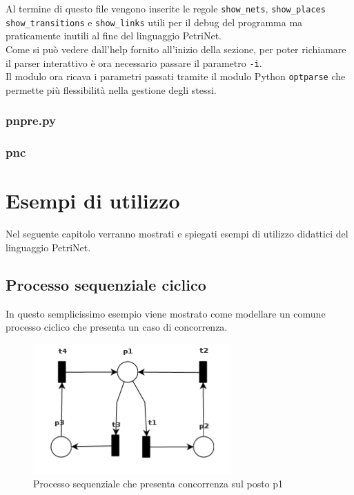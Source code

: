 \documentclass[italian,12pt]{book}
\begin{document}
Al termine di questo file vengono inserite le regole {\tt show\_nets}, {\tt show\_places} {\tt show\_transitions} e {\tt show\_links} utili per il debug del programma ma praticamente inutili al fine del linguaggio PetriNet.\\
Come si può vedere dall'help fornito all'inizio della sezione, per poter
richiamare il parser interattivo è ora necessario passare il parametro {\tt -i}.\\
Il modulo ora ricava i parametri passati tramite il modulo Python {\tt optparse} che 
permette più flessibilità nella gestione degli stessi.

\subsection{pnpre.py}

\subsection{pnc}


\chapter{Esempi di utilizzo}\label{cap:esempi}
Nel seguente capitolo verranno mostrati e spiegati esempi di utilizzo didattici del linguaggio PetriNet.

\section{Processo sequenziale ciclico}
In questo semplicissimo esempio viene mostrato come modellare un comune processo ciclico che presenta un caso di concorrenza.
\begin{figure}[htb]
\centerline{\includegraphics[height=5cm]{img/processo_seq_concorrenza.png}}
\caption{Processo sequenziale che presenta concorrenza sul posto p1}\label{fig:processo_seq_concorrenza.png}
\end{figure}
\end{document}
